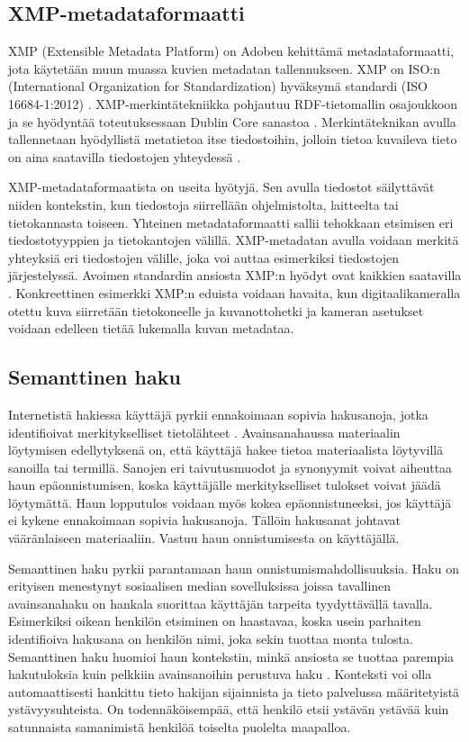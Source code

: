 \documentclass[finnish, 12pt, a4paper, elec, utf8, pdfa, online]{aaltothesis}
\begin{document}
{\subsection{XMP-metadataformaatti}
XMP (Extensible Metadata Platform) on Adoben kehittämä metadataformaatti, jota käytetään muun muassa kuvien metadatan tallennukseen. XMP on ISO:n (International Organization for Standardization) hyväksymä standardi (ISO 16684-1:2012) \cite{XMP_standard}. XMP-merkintätekniikka pohjautuu RDF-tietomallin osajoukkoon ja se hyödyntää toteutuksessaan Dublin Core sanastoa \cite{XMP2}. Merkintäteknikan avulla tallennetaan hyödyllistä metatietoa itse tiedostoihin, jolloin tietoa kuvaileva tieto on aina saatavilla tiedostojen yhteydessä \cite{XMP1}.

XMP-metadataformaatista on useita hyötyjä. Sen avulla tiedostot säilyttävät niiden kontekstin, kun tiedostoja siirrellään ohjelmistolta, laitteelta tai tietokannasta toiseen. Yhteinen metadataformaatti sallii tehokkaan etsimisen eri tiedostotyyppien ja tietokantojen välillä. XMP-metadatan avulla voidaan merkitä yhteyksiä eri tiedostojen välille, joka voi auttaa esimerkiksi tiedostojen järjestelyssä. Avoimen standardin ansiosta XMP:n hyödyt ovat kaikkien saatavilla \cite{XMP_overall}. Konkreettinen esimerkki XMP:n eduista voidaan havaita, kun digitaalikameralla otettu kuva siirretään tietokoneelle ja kuvanottohetki ja kameran asetukset voidaan edelleen tietää lukemalla kuvan metadataa.


\subsection{Semanttinen haku}

Internetistä hakiessa käyttäjä pyrkii ennakoimaan sopivia hakusanoja, jotka identifioivat merkitykselliset tietolähteet \cite{keyword_search}. Avainsanahaussa materiaalin löytymisen edellytyksenä on, että käyttäjä hakee tietoa materiaalista löytyvillä sanoilla tai termillä. Sanojen eri taivutusmuodot ja synonyymit voivat aiheuttaa haun epäonnistumisen, koska käyttäjälle merkitykselliset tulokset voivat jäädä löytymättä. Haun lopputulos voidaan myös kokea epäonnistuneeksi, jos käyttäjä ei kykene ennakoimaan sopivia hakusanoja. Tällöin hakusanat johtavat vääränlaiseen materiaaliin. Vastuu haun onnistumisesta on käyttäjällä.

Semanttinen haku pyrkii parantamaan haun onnistumismahdollisuuksia. Haku on erityisen menestynyt sosiaalisen median sovelluksissa joissa tavallinen avainsanahaku on hankala suorittaa käyttäjän tarpeita tyydyttävällä tavalla. Esimerkiksi oikean henkilön etsiminen on haastavaa, koska usein parhaiten identifioiva hakusana on henkilön nimi, joka sekin tuottaa monta tulosta. Semanttinen haku huomioi haun kontekstin, minkä ansiosta se tuottaa parempia hakutuloksia kuin pelkkiin avainsanoihin perustuva haku \cite{profium_search}. Konteksti voi olla automaattisesti hankittu tieto hakijan sijainnista ja tieto palvelussa määritetyistä ystävyysuhteista. On todennäköisempää, että henkilö etsii ystävän ystävää kuin satunnaista samanimistä henkilöä toiselta puolelta maapalloa.

}
\end{document}
